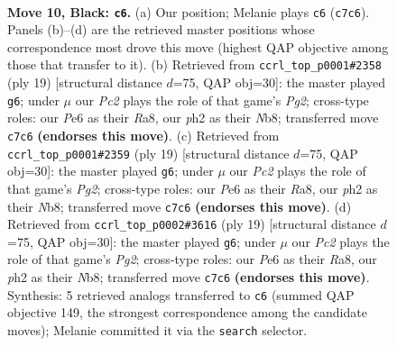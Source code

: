 \documentclass[11pt]{article}
\begin{document}
\clearpage

\begin{figure}[p]\centering
\begin{subfigure}{0.46\textwidth}\centering
\resizebox{\linewidth}{!}{%
\newchessgame
\chessboard[
  setfen={rnb1r2k/pppnqppp/4p3/3pP3/3P4/2N1Q3/PPP2PPP/2K1RBNR b - - 7 10},
  showmover=false,
  pgfstyle=straightmove, color=movearrow, markmove={c7-c6}
]}
\caption{}
\end{subfigure}\hfill
\begin{subfigure}{0.46\textwidth}\centering
\resizebox{\linewidth}{!}{%
\newchessgame
\chessboard[
  setfen={rn1qkb1r/1p3pp1/p2p1n2/3Pp2p/8/1N2BP2/PPP3PP/R2QKB1R b KQkq - 0 10},
  showmover=false,
  pgfstyle=straightmove, color=movearrow, markmove={g7-g6}
]}
\caption{}
\end{subfigure}
\\[4pt]
\begin{subfigure}{0.46\textwidth}\centering
\resizebox{\linewidth}{!}{%
\newchessgame
\chessboard[
  setfen={rn1qkb1r/1p3pp1/p2p1n2/3Pp2p/8/1N2BP2/PPP3PP/R2QKB1R b KQkq - 0 10},
  showmover=false,
  pgfstyle=straightmove, color=movearrow, markmove={g7-g6}
]}
\caption{}
\end{subfigure}\hfill
\begin{subfigure}{0.46\textwidth}\centering
\resizebox{\linewidth}{!}{%
\newchessgame
\chessboard[
  setfen={rn1qkb1r/1p3pp1/p2p1n2/3Pp2p/8/1N2BP2/PPP3PP/R2QKB1R b KQkq - 0 10},
  showmover=false,
  pgfstyle=straightmove, color=movearrow, markmove={g7-g6}
]}
\caption{}
\end{subfigure}
\caption{\textbf{Move 10, Black: \texttt{c6}.} (a) Our position; Melanie plays \texttt{c6} (\texttt{c7c6}). Panels (b)--(d) are the retrieved master positions whose correspondence most drove this move (highest QAP objective among those that transfer to it). (b) Retrieved from \texttt{ccrl\_top\_p0001\#2358} (ply 19) [structural distance $d$=75, QAP obj=30]: the master played \texttt{g6}; under $\mu$ our \emph{Pc2} plays the role of that game's \emph{Pg2}; cross-type roles: our \emph{P}e6 as their \emph{R}a8, our \emph{p}h2 as their \emph{N}b8; transferred move \texttt{c7c6} \textbf{(endorses this move)}. (c) Retrieved from \texttt{ccrl\_top\_p0001\#2359} (ply 19) [structural distance $d$=75, QAP obj=30]: the master played \texttt{g6}; under $\mu$ our \emph{Pc2} plays the role of that game's \emph{Pg2}; cross-type roles: our \emph{P}e6 as their \emph{R}a8, our \emph{p}h2 as their \emph{N}b8; transferred move \texttt{c7c6} \textbf{(endorses this move)}. (d) Retrieved from \texttt{ccrl\_top\_p0002\#3616} (ply 19) [structural distance $d$=75, QAP obj=30]: the master played \texttt{g6}; under $\mu$ our \emph{Pc2} plays the role of that game's \emph{Pg2}; cross-type roles: our \emph{P}e6 as their \emph{R}a8, our \emph{p}h2 as their \emph{N}b8; transferred move \texttt{c7c6} \textbf{(endorses this move)}. Synthesis: 5 retrieved analogs transferred to \texttt{c6} (summed QAP objective 149, the strongest correspondence among the candidate moves); Melanie committed it via the \texttt{search} selector.}
\label{fig:thought-m19}
\end{figure}
\end{document}

